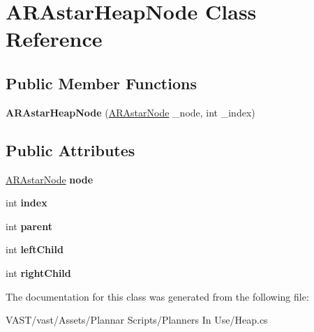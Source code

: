 \hypertarget{class_a_r_astar_heap_node}{\section{A\-R\-Astar\-Heap\-Node Class Reference}
\label{class_a_r_astar_heap_node}
}
\subsection*{Public Member Functions}
\begin{DoxyCompactItemize}
\item 
\hypertarget{class_a_r_astar_heap_node_a024e3ef79561fc0c15a0f6420729e9b0}{{\bfseries A\-R\-Astar\-Heap\-Node} (\hyperlink{class_a_r_astar_node}{A\-R\-Astar\-Node} \-\_\-node, int \-\_\-index)}\label{class_a_r_astar_heap_node_a024e3ef79561fc0c15a0f6420729e9b0}

\end{DoxyCompactItemize}
\subsection*{Public Attributes}
\begin{DoxyCompactItemize}
\item 
\hypertarget{class_a_r_astar_heap_node_ac766db8d3cb63c58c56c73097ebb22d7}{\hyperlink{class_a_r_astar_node}{A\-R\-Astar\-Node} {\bfseries node}}\label{class_a_r_astar_heap_node_ac766db8d3cb63c58c56c73097ebb22d7}

\item 
\hypertarget{class_a_r_astar_heap_node_a3f8678a53e656f69e7aa5c5e2f35b59b}{int {\bfseries index}}\label{class_a_r_astar_heap_node_a3f8678a53e656f69e7aa5c5e2f35b59b}

\item 
\hypertarget{class_a_r_astar_heap_node_ab461374341ff031553fe8cd724410bf3}{int {\bfseries parent}}\label{class_a_r_astar_heap_node_ab461374341ff031553fe8cd724410bf3}

\item 
\hypertarget{class_a_r_astar_heap_node_a2dbbf8de61f62a3f548203fb5ad447b9}{int {\bfseries left\-Child}}\label{class_a_r_astar_heap_node_a2dbbf8de61f62a3f548203fb5ad447b9}

\item 
\hypertarget{class_a_r_astar_heap_node_a4722e1999dd6b0d3402796c82be44a44}{int {\bfseries right\-Child}}\label{class_a_r_astar_heap_node_a4722e1999dd6b0d3402796c82be44a44}

\end{DoxyCompactItemize}


The documentation for this class was generated from the following file\-:\begin{DoxyCompactItemize}
\item 
V\-A\-S\-T/vast/\-Assets/\-Plannar Scripts/\-Planners In Use/Heap.\-cs\end{DoxyCompactItemize}
